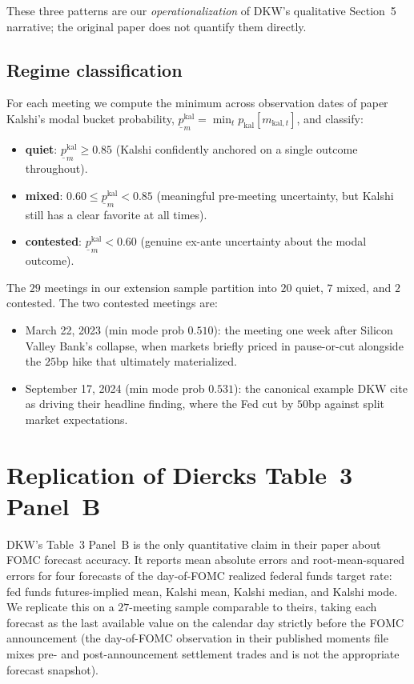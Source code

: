\documentclass[11pt]{article}
\begin{document}
These three patterns are our \emph{operationalization} of DKW's
qualitative Section~5 narrative; the original paper does not quantify
them directly.

\subsection{Regime classification}

For each meeting we compute the minimum across observation dates of
paper Kalshi's modal bucket probability,
$\underline{p}_m^{\mathrm{kal}} = \min_t p_{\mathrm{kal}}[m_{
\mathrm{kal},t}]$, and classify:

\begin{itemize}[itemsep=0pt,topsep=0pt]
\item \textbf{quiet}: $\underline{p}_m^{\mathrm{kal}} \geq 0.85$
(Kalshi confidently anchored on a single outcome throughout).
\item \textbf{mixed}: $0.60 \leq \underline{p}_m^{\mathrm{kal}} < 0.85$
(meaningful pre-meeting uncertainty, but Kalshi still has a clear
favorite at all times).
\item \textbf{contested}: $\underline{p}_m^{\mathrm{kal}} < 0.60$
(genuine ex-ante uncertainty about the modal outcome).
\end{itemize}

The $29$ meetings in our extension sample partition into $20$ quiet,
$7$ mixed, and $2$ contested. The two contested meetings are:

\begin{itemize}[itemsep=0pt,topsep=0pt]
\item March 22, 2023 (min mode prob $0.510$): the meeting one week
after Silicon Valley Bank's collapse, when markets briefly priced
in pause-or-cut alongside the $25$bp hike that ultimately
materialized.
\item September 17, 2024 (min mode prob $0.531$): the canonical
example DKW cite as driving their headline finding, where the Fed
cut by $50$bp against split market expectations.
\end{itemize}

\section{Replication of Diercks Table~3 Panel~B}\label{sec:replication}

DKW's Table~3 Panel~B is the only quantitative claim in their paper
about FOMC forecast accuracy. It reports mean absolute errors and
root-mean-squared errors for four forecasts of the day-of-FOMC
realized federal funds target rate: fed funds futures-implied mean,
Kalshi mean, Kalshi median, and Kalshi mode. We replicate this on a
$27$-meeting sample comparable to theirs, taking each forecast as the
last available value on the calendar day strictly before the FOMC
announcement (the day-of-FOMC observation in their published moments
file mixes pre- and post-announcement settlement trades and is not
the appropriate forecast snapshot).
\end{document}
